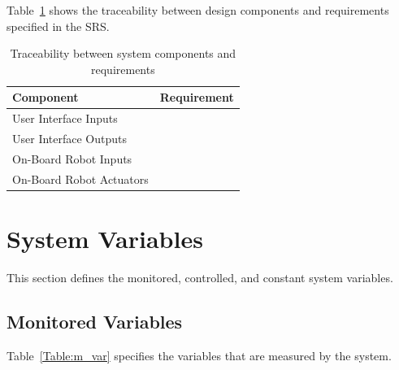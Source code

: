 \documentclass[12pt, titlepage]{article}
\begin{document}
Table~\ref{Table:Traceability} shows the traceability between design components and requirements specified in the SRS.
  
\begin{table}[H]
\caption{Traceability between system components and requirements}
\label{Table:Traceability}
\begin{tabularx}{\textwidth}{|l|X|}
\hline
\textbf{Component}       & \textbf{Requirement} \\ \hline
User Interface Inputs    &                      \\ \hline
User Interface Outputs   &                      \\ \hline
On-Board Robot Inputs    &                      \\ \hline
On-Board Robot Actuators &                      \\ \hline
\end{tabularx}
\end{table}

\section{System Variables}
\label{sec_SysVars}


This section defines the monitored, controlled, and constant system variables.

\subsection{Monitored Variables}

Table~\ref{Table:m_var} specifies the variables that are measured by the system.
\end{document}

